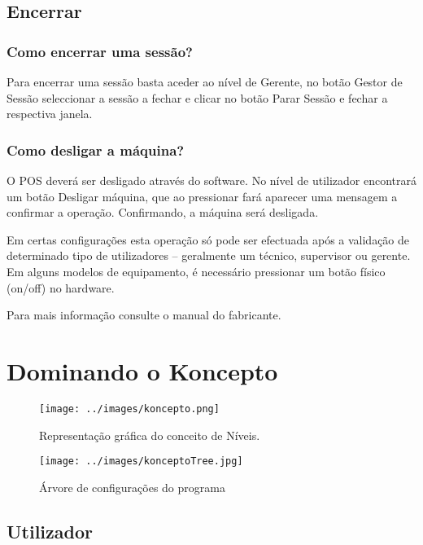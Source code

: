 \documentclass[a4paper,11pt,openany]{memoir}
\begin{document}
\chapter{Encerrar}
\section{Como encerrar uma sessão?}
Para encerrar uma sessão basta aceder ao nível de Gerente, no botão Gestor de
Sessão seleccionar a sessão a fechar e clicar no botão Parar Sessão e fechar a
respectiva janela.

\section{Como desligar a máquina?}
O POS deverá ser desligado através do software. No nível de utilizador encontrará
um botão Desligar máquina, que ao pressionar fará aparecer uma mensagem a
confirmar a operação. Confirmando, a máquina será desligada.

Em certas configurações esta operação só pode ser efectuada após a validação de
determinado tipo de utilizadores – geralmente um técnico, supervisor ou gerente.
Em alguns modelos de equipamento, é necessário pressionar um botão físico
(on/off) no hardware.

Para mais informação consulte o manual do fabricante.


\part{Dominando o Koncepto}

                 


\begin{figure}
\texttt{[image: ../images/koncepto.png]}
\caption[Submanifold]{Representação gráfica do conceito de Níveis.}
\end{figure}

\begin{figure}
\texttt{[image: ../images/konceptoTree.jpg]}
\caption[Submanifold]{Árvore de configurações do programa}
\end{figure}




\chapter{Utilizador} 
\end{document}
